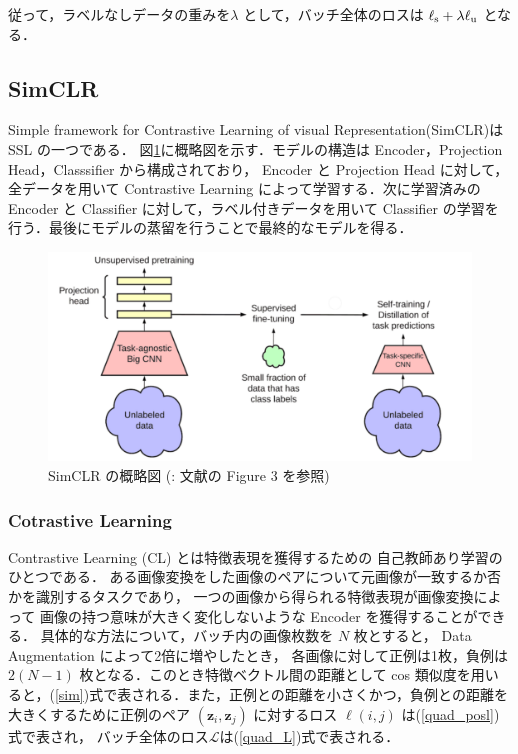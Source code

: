 従って，ラベルなしデータの重みを$\lambda$	として，バッチ全体のロスは ${\ell}_{\rm s}+\lambda {\ell}_{\rm u}$ となる．

\changeindent{0cm}
\subsection{SimCLR}
\changeindent{2cm}
Simple framework for Contrastive Learning of visual Representation(SimCLR)\cite{chen2020simple}は SSL の一つである．
図\ref{fig:SimCLR}に概略図を示す．モデルの構造は Encoder，Projection Head，Classsifier
から構成されており， Encoder と Projection Head に対して，全データを用いて Contrastive Learning によって学習する．次に学習済みの Encoder と Classifier に対して，ラベル付きデータを用いて Classifier の学習を行う．最後にモデルの蒸留\cite{hinton2015distilling}を行うことで最終的なモデルを得る．

\begin{figure}[h]
	\begin{center}
		\includegraphics[scale=1.0]{./images/SimCLR.png}
		\caption[SimCLR の概略図]
		{SimCLR の概略図 (: 文献\cite{chen2020big}の Figure 3 を参照\label{fig:SimCLR})}
	\end{center}
\end{figure}

\changeindent{0cm}
\subsubsection{Cotrastive Learning}
\changeindent{2cm}
Contrastive Learning (CL)\cite{tian2020makes} とは特徴表現を獲得するための
自己教師あり学習\cite{doersch2017multi}のひとつである．
ある画像変換をした画像のペアについて元画像が一致するか否かを識別するタスクであり，
一つの画像から得られる特徴表現が画像変換によって
画像の持つ意味が大きく変化しないような Encoder を獲得することができる．
具体的な方法について，バッチ内の画像枚数を $N$ 枚とすると， Data Augmentation によって2倍に増やしたとき，
各画像に対して正例は1枚，負例は $2(N-1)$ 枚となる．このとき特徴ベクトル間の距離として cos 類似度を用いると，(\ref{sim})式で表される．また，正例との距離を小さくかつ，負例との距離を大きくするために正例のペア $({\bm z}_i,{\bm z}_j)$ に対するロス $\ell(i, j)$ は(\ref{quad_posl})式で表され，
バッチ全体のロス$\mathcal L$は(\ref{quad_L})式で表される．

